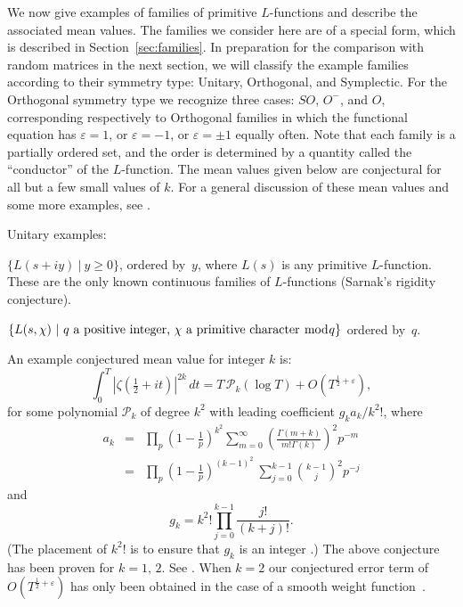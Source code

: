 \documentclass[12pt,letterpaper]{amsart}
\theoremstyle{plain}
\theoremstyle{definition}
\theoremstyle{remark}
\numberwithin{equation}{subsection}
\numberwithin{theorem}{subsection}
\numberwithin{table}{subsection}
\def\myitem#1{\noindent{\it #1 }}
\begin{document}
We now give examples of families of primitive  
$L$-functions and describe the
associated mean values.  The families we consider here are of a
special form, 
which is described in Section~\ref{sec:families}. In preparation
for the comparison with random matrices in the next section, we
will classify the example families according to their symmetry
type: Unitary, Orthogonal, and Symplectic.
For the Orthogonal symmetry type we recognize three cases:
$SO$, $O^-$, and $O$, corresponding respectively to Orthogonal families 
in which the functional equation has $\varepsilon=1$, or
$\varepsilon=-1$, or $\varepsilon=\pm 1$ equally often.
 Note that each
family is a partially ordered set, and the order 
is determined by a quantity called the ``conductor'' of the
$L$-function. The mean values given below are conjectural for all
but a few small values of $k$.
%
For a general discussion of these mean values
and some more examples, see \cite{CF}.

Unitary examples:

\myitem{1)} $\{L(s+ iy)\ |\ y\ge 0\}$, ordered by~$y$,
where $L(s)$ is any primitive $L$-function.
These are the only known continuous families of $L$-functions (Sarnak's rigidity conjecture).

\myitem{2)} $\{L(s,\chi)\ |\ q \hbox{ a positive integer,
        $\chi$ a primitive character $\bmod q$}\}$ ordered by~$q$.

An example conjectured  mean value for integer $k$ is:
\begin{equation}  \int_0^T |\zeta(\tfrac12 +it)|^{2k}\,dt  = T \, {\mathcal P}_{k}(\log T) +O(T^{\frac12 +\varepsilon}),
\label{eqn:zeta2k}
\end{equation}
for some polynomial ${\mathcal P}_{k}$ of degree $k^2$ with
leading coefficient $g_k a_k/{k^2!}$, where
\begin{eqnarray}
a_k& =  &\prod_p \left(1-\tfrac{1}{p}\right)^{k^2}
\sum_{m=0}^{\infty} \left( \frac{\Gamma(m+k)} {m! \Gamma(k)}
\right)^2 p^{-m} \nonumber \\ & =  &\prod_p\left(1-\tfrac 1p\right)^{(k-1)^2}
\ \sum_{j=0}^{k-1}\binom{k-1}{j}^2p^{-j}  \label{eqn:zeta2kak} \end{eqnarray}
and
\begin{equation}
g_k=  k^2 ! \prod_{j=0}^{k-1}\frac{j!}{(k+j)!}.
\label{eqn:zeta2kgk}
\end{equation}
(The placement of $k^2!$ is to ensure that $g_k$ is an integer
\cite{CF}.)  The above conjecture 
has been proven for $k=1,\,2$.
See \cite{HL,I,A,Ko,H-B1,C,Mot}.  
When $k=2$ our conjectured error term of $O(T^{\frac12+\varepsilon})$
has only been obtained in the case of a smooth weight function~\cite{Iv1}.
\end{document}
